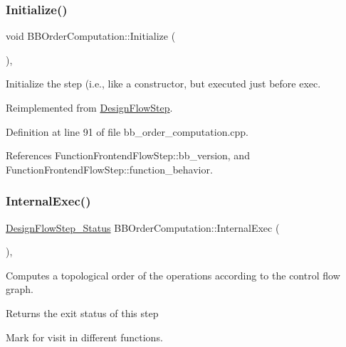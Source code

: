 \subsubsection{\texorpdfstring{Initialize()}{Initialize()}}
{\footnotesize\ttfamily void B\+B\+Order\+Computation\+::\+Initialize (\begin{DoxyParamCaption}{ }\end{DoxyParamCaption})\hspace{0.3cm}{\ttfamily [override]}, {\ttfamily [virtual]}}



Initialize the step (i.\+e., like a constructor, but executed just before exec. 



Reimplemented from \hyperlink{classDesignFlowStep_a44b50683382a094976e1d432a7784799}{Design\+Flow\+Step}.



Definition at line 91 of file bb\+\_\+order\+\_\+computation.\+cpp.



References Function\+Frontend\+Flow\+Step\+::bb\+\_\+version, and Function\+Frontend\+Flow\+Step\+::function\+\_\+behavior.

\mbox{\label{classBBOrderComputation_aa7ab804417c52182c8e30b5346e210f0}} 
\subsubsection{\texorpdfstring{Internal\+Exec()}{InternalExec()}}
{\footnotesize\ttfamily \hyperlink{design__flow__step_8hpp_afb1f0d73069c26076b8d31dbc8ebecdf}{Design\+Flow\+Step\+\_\+\+Status} B\+B\+Order\+Computation\+::\+Internal\+Exec (\begin{DoxyParamCaption}{ }\end{DoxyParamCaption})\hspace{0.3cm}{\ttfamily [override]}, {\ttfamily [virtual]}}



Computes a topological order of the operations according to the control flow graph. 

\begin{DoxyReturn}{Returns}
the exit status of this step 
\end{DoxyReturn}
Mark for visit in different functions.

